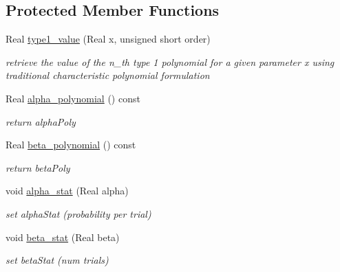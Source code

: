 \subsection*{Protected Member Functions}
\begin{DoxyCompactItemize}
\item 
Real \hyperlink{classPecos_1_1MeixnerOrthogPolynomial_a8792a858ac05a2158880e876f9da2019}{type1\+\_\+value} (Real x, unsigned short order)
\begin{DoxyCompactList}\small\item\em retrieve the value of the n\+\_\+th type 1 polynomial for a given parameter x using traditional characteristic polynomial formulation \end{DoxyCompactList}\item 
Real \hyperlink{classPecos_1_1MeixnerOrthogPolynomial_a997bdeddf670667c476513fcacc779ca}{alpha\+\_\+polynomial} () const \label{classPecos_1_1MeixnerOrthogPolynomial_a997bdeddf670667c476513fcacc779ca}

\begin{DoxyCompactList}\small\item\em return alpha\+Poly \end{DoxyCompactList}\item 
Real \hyperlink{classPecos_1_1MeixnerOrthogPolynomial_a22bfc4209dec76716ef51648e945469a}{beta\+\_\+polynomial} () const \label{classPecos_1_1MeixnerOrthogPolynomial_a22bfc4209dec76716ef51648e945469a}

\begin{DoxyCompactList}\small\item\em return beta\+Poly \end{DoxyCompactList}\item 
void \hyperlink{classPecos_1_1MeixnerOrthogPolynomial_aeeb4ce11a8d413209be1ec08eced8728}{alpha\+\_\+stat} (Real alpha)\label{classPecos_1_1MeixnerOrthogPolynomial_aeeb4ce11a8d413209be1ec08eced8728}

\begin{DoxyCompactList}\small\item\em set alpha\+Stat (probability per trial) \end{DoxyCompactList}\item 
void \hyperlink{classPecos_1_1MeixnerOrthogPolynomial_a7f9584e538ee1574bd4d8d1afb622ed6}{beta\+\_\+stat} (Real beta)\label{classPecos_1_1MeixnerOrthogPolynomial_a7f9584e538ee1574bd4d8d1afb622ed6}

\begin{DoxyCompactList}\small\item\em set beta\+Stat (num trials) \end{DoxyCompactList}\end{DoxyCompactItemize}
